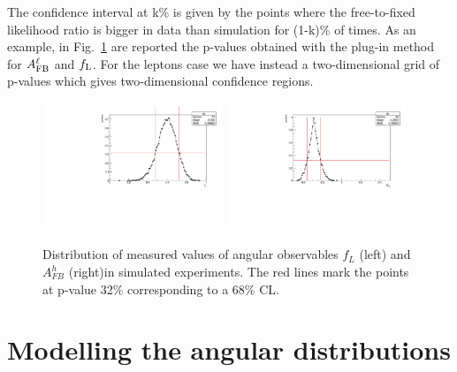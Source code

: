 The confidence interval at k\% is given by the points where the free-to-fixed likelihood ratio is bigger in data than
simulation for (1-k)\% of times. As an example, in Fig.~\ref{fig:FCexample} are reported the p-values obtained
with the plug-in method for $A_{\rm FB}^\ell$ and $f_{\rm L}$. For the leptons case we have instead a two-dimensional grid of p-values
which gives two-dimensional confidence regions.
%
\begin{figure}[h!]
\centering
\includegraphics[width=0.48\textwidth]{Lmumu/figs/pvalue_fL_1500_2000.pdf}
\includegraphics[width=0.48\textwidth]{Lmumu/figs/pvalue_afbB_1500_2000.pdf}
\caption{ Distribution of measured values of angular observables $f_{L}$ (left) 
and $A_{FB}^h$ (right)in simulated experiments. The red lines mark the points
at p-value 32\% corresponding to a 68\% CL.}
\label{fig:FCexample}
\end{figure}

\section{Modelling the angular distributions}
\label{sec:angfit}

